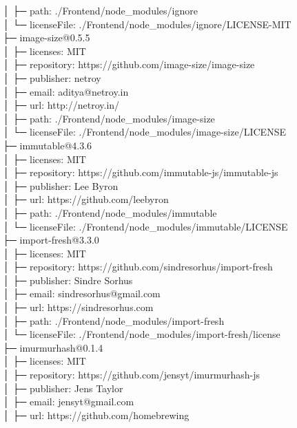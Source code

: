 \documentclass[
    paper=a4,
    twoside=false,
    parskip=half,
    listof=entryprefix,
    listof=totoc,
    index=totoc,
    bibliography=totoc,
    headsepline,
]{scrbook}
\begin{document}
    │  ├─ path: ./Frontend/node\_modules/ignore\\
    │  └─ licenseFile: ./Frontend/node\_modules/ignore/LICENSE-MIT\\
    ├─ image-size@0.5.5\\
    │  ├─ licenses: MIT\\
    │  ├─ repository: https://github.com/image-size/image-size\\
    │  ├─ publisher: netroy\\
    │  ├─ email: aditya@netroy.in\\
    │  ├─ url: http://netroy.in/\\
    │  ├─ path: ./Frontend/node\_modules/image-size\\
    │  └─ licenseFile: ./Frontend/node\_modules/image-size/LICENSE\\
    ├─ immutable@4.3.6\\
    │  ├─ licenses: MIT\\
    │  ├─ repository: https://github.com/immutable-js/immutable-js\\
    │  ├─ publisher: Lee Byron\\
    │  ├─ url: https://github.com/leebyron\\
    │  ├─ path: ./Frontend/node\_modules/immutable\\
    │  └─ licenseFile: ./Frontend/node\_modules/immutable/LICENSE\\
    ├─ import-fresh@3.3.0\\
    │  ├─ licenses: MIT\\
    │  ├─ repository: https://github.com/sindresorhus/import-fresh\\
    │  ├─ publisher: Sindre Sorhus\\
    │  ├─ email: sindresorhus@gmail.com\\
    │  ├─ url: https://sindresorhus.com\\
    │  ├─ path: ./Frontend/node\_modules/import-fresh\\
    │  └─ licenseFile: ./Frontend/node\_modules/import-fresh/license\\
    ├─ imurmurhash@0.1.4\\
    │  ├─ licenses: MIT\\
    │  ├─ repository: https://github.com/jensyt/imurmurhash-js\\
    │  ├─ publisher: Jens Taylor\\
    │  ├─ email: jensyt@gmail.com\\
    │  ├─ url: https://github.com/homebrewing\\
\end{document}
